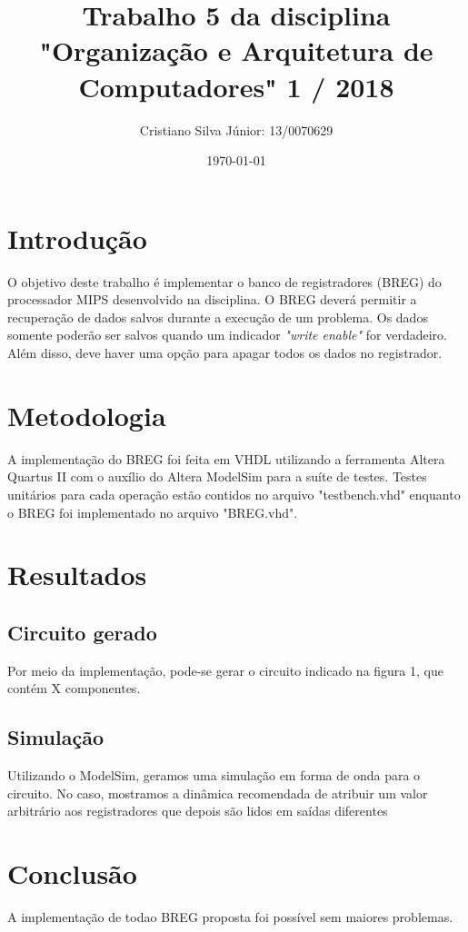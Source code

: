 \documentclass[12pt, a4paper, twoside]{article}
\begin{document}
\title{Trabalho 5 da disciplina "Organização e Arquitetura de Computadores" 1 /
2018}
\author{Cristiano Silva Júnior: 13/0070629}
\date{\today}
\maketitle

\section{Introdução}

O objetivo deste trabalho é implementar o banco de registradores (BREG) do
processador MIPS desenvolvido na disciplina. O BREG deverá permitir a
recuperação de dados salvos durante a execução de um problema. Os dados somente
poderão ser salvos quando um indicador \textit{"write enable"} for verdadeiro.
Além disso, deve haver uma opção para apagar todos os dados no registrador.

\section{Metodologia}

A implementação do BREG foi feita em VHDL utilizando a ferramenta Altera Quartus
II com o auxílio do Altera ModelSim para a suíte de testes. Testes unitários
para cada operação estão contidos no arquivo "testbench.vhd" enquanto o BREG
foi implementado no arquivo "BREG.vhd".

\section{Resultados}

\subsection{Circuito gerado}

Por meio da implementação, pode-se gerar o circuito indicado na figura 1,
que contém X componentes.


\subsection{Simulação}

Utilizando o ModelSim, geramos uma simulação em forma de onda para o circuito.
No caso, mostramos a dinâmica recomendada de atribuir um valor arbitrário aos
registradores que depois são lidos em saídas diferentes


\section{Conclusão}

A implementação de todao BREG proposta foi possível sem maiores problemas.
\end{document}
